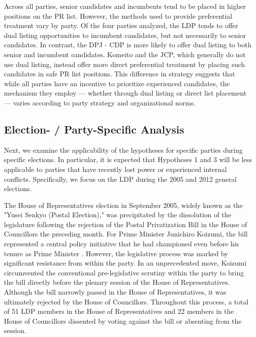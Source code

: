 \documentclass[a4paper, 11pt]{article}
\begin{document}
Across all parties, senior candidates and incumbents tend to be placed in higher positions on the PR list. However, the methods used to provide preferential treatment vary by party. Of the four parties analyzed, the LDP tends to offer dual listing opportunities to incumbent candidates, but not necessarily to senior candidates. In contrast, the DPJ - CDP is more likely to offer dual listing to both senior and incumbent candidates. Komeito and the JCP, which generally do not use dual listing, instead offer more direct preferential treatment by placing such candidates in safe PR list positions. This difference in strategy suggests that while all parties have an incentive to prioritize experienced candidates, the mechanism they employ — whether through dual listing or direct list placement — varies according to party strategy and organizational norms.

\subsection{Election- / Party-Specific Analysis}

Next, we examine the applicability of the hypotheses for specific parties during specific elections. In particular, it is expected that Hypotheses 1 and 3 will be less applicable to parties that have recently lost power or experienced internal conflicts. Specifically, we focus on the LDP during the 2005 and 2012 general elections.

The House of Representatives election in September 2005, widely known as the "Yusei Senkyo (Postal Election)," was precipitated by the dissolution of the legislature following the rejection of the Postal Privatization Bill in the House of Councillors the preceding month. For Prime Minister Junichiro Koizumi, the bill represented a central policy initiative that he had championed even before his tenure as Prime Minister \citep{uchiyamaKoizumiSeikenKoizumis2007}. However, the legislative process was marked by significant resistance from within the party. In an unprecedented move, Koizumi circumvented the conventional pre-legislative scrutiny within the party to bring the bill directly before the plenary session of the House of Representatives.\footnotemark{} Although the bill narrowly passed in the House of Representatives, it was ultimately rejected by the House of Councillors. Throughout this process, a total of 51 LDP members in the House of Representatives and 22 members in the House of Councillors dissented by voting against the bill or absenting from the session. 
\end{document}
